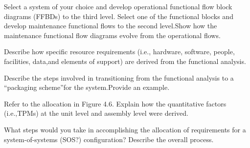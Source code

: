 \begin{exercises}
    \begin{exercise}
    \label{sea-04-01}
        Select a system of your choice and develop operational functional flow block diagrams (FFBDs) to the third level. Select one of the functional blocks and develop maintenance functional flows to the second level.Show how the maintenance functional flow diagrams evolve from the operational flows.
    \end{exercise}
    \begin{solution}
    \end{solution}
    
    \begin{exercise}
    \label{sea-04-02}
        Describe how specific resource requirements (i.e., hardware, software, people, facilities, data,and elements of support) are derived from the functional analysis.
    \end{exercise}
    \begin{solution}
    \end{solution}
    
    \begin{exercise}
    \label{sea-04-03}
        Describe the steps involved in transitioning from the functional analysis to a “packaging scheme”for the system.Provide an example.
    \end{exercise}
    \begin{solution}
    \end{solution}
    
    \begin{exercise}
    \label{sea-04-04}
        Refer to the allocation in Figure 4.6. Explain how the quantitative factors (i.e.,TPMs) at the unit level and assembly level were derived.
    \end{exercise}
    \begin{solution}
    \end{solution}
    
    \begin{exercise}
    \label{sea-04-05}
        What steps would you take in accomplishing the allocation of requirements for a system-of-systems (SOS?) configuration? Describe the overall process.
    \end{exercise}
    \begin{solution}
    \end{solution}
    

\end{exercises}

